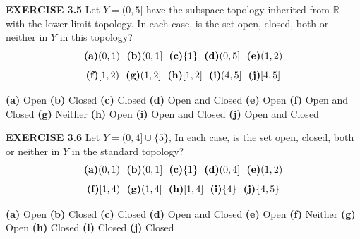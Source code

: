\documentclass[12pt]{article}
\begin{document}
  \newpage
  \noindent
  \textbf{EXERCISE 3.5} Let \(Y = (0,5]\) have the subspace topology inherited from \(\mathbb{R}\) with the lower limit topology. In each case, is the set open, closed, both or neither in \(Y\) in this topology?
  \[\textup{\textbf{(a)}} (0,1)\ \ \textup{\textbf{(b)}} (0,1]\ \ \textup{\textbf{(c)}}\{1\}\ \ \textup{\textbf{(d)}}(0,5]\ \ \textup{\textbf{(e)}} (1,2)\]
  \[\textup{\textbf{(f)}} [1,2)\ \ \textup{\textbf{(g)}} (1,2]\ \ \textup{\textbf{(h)}}[1,2]\ \ \textup{\textbf{(i)}}(4,5]\ \ \textup{\textbf{(j)}} [4,5]\]
  \newline
  \begin{adjustwidth}{1cm}{0cm}
    \begin{flushleft}
      \textbf{(a)} Open \newline
      \textbf{(b)} Closed \newline
      \textbf{(c)} Closed \newline
      \textbf{(d)} Open and Closed \newline
      \textbf{(e)} Open \newline
      \textbf{(f)} Open and Closed \newline
      \textbf{(g)} Neither \newline
      \textbf{(h)} Open \newline
      \textbf{(i)} Open and Closed \newline
      \textbf{(j)} Open and Closed
    \end{flushleft}
  \end{adjustwidth}
  \newpage
  \noindent
  \textbf{EXERCISE 3.6} Let \(Y = (0,4] \cup \{5\}\), In each case, is the set open, closed, both or neither in \(Y\) in the standard topology?
  \[\textup{\textbf{(a)}} (0,1)\ \ \textup{\textbf{(b)}} (0,1]\ \ \textup{\textbf{(c)}}\{1\}\ \ \textup{\textbf{(d)}}(0,4]\ \ \textup{\textbf{(e)}} (1,2)\]
  \[\textup{\textbf{(f)}} [1,4)\ \ \textup{\textbf{(g)}} (1,4]\ \ \textup{\textbf{(h)}}[1,4]\ \ \textup{\textbf{(i)}}\{4\}\ \ \textup{\textbf{(j)}} \{4,5\}\]
  \newline
  \begin{adjustwidth}{1cm}{0cm}
    \begin{flushleft}
      \textbf{(a)} Open \newline
      \textbf{(b)} Closed \newline
      \textbf{(c)} Closed \newline
      \textbf{(d)} Open and Closed \newline
      \textbf{(e)} Open \newline
      \textbf{(f)} Neither \newline
      \textbf{(g)} Open \newline
      \textbf{(h)} Closed \newline
      \textbf{(i)} Closed \newline
      \textbf{(j)} Closed
    \end{flushleft}
  \end{adjustwidth}
\end{document}
